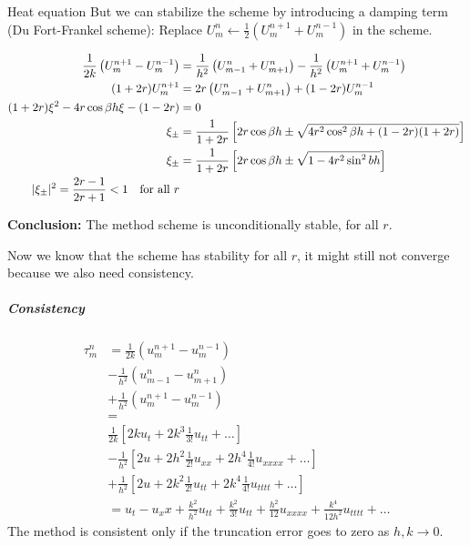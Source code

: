 \begin{example}{Heat equation}{}
  But we can stabilize the scheme by introducing a damping term (Du Fort-Frankel scheme):
  Replace \( U_m^n \leftarrow \frac{1}{2}(U_m^{n+1} + U_m^{n-1}) \) in the scheme.

  \begin{align*}
    \frac{1}{2k}\left( U_m^{n+1} - U_m^{n-1} \right)
     & =
    \frac{1}{h^2}\left( U_{m-1}^n + U_{m+1}^n\right) - \frac{1}{h^2}\left( U_m^{n+1} + U_m^{n-1} \right) \\
    (1 + 2r)U_m^{n+1}
     & =
    2r\left( U_{m-1}^n + U_{m+1}^n \right) + (1 - 2r)U_m^{n-1}                                           \\
    (1 + 2r)\xi^2 - 4r \cos \beta h \xi - (1 - 2r)
     & = 0                                                                                               \\
    \xi_\pm
     & = \frac{1}{1 + 2r} \left[ 2r\cos \beta h \pm \sqrt{4r^2\cos^2 \beta h + (1 - 2r)(1 + 2r)} \right] \\
    \xi_\pm
     & = \frac{1}{1 + 2r} \left[ 2r\cos \beta h \pm \sqrt{1 - 4r^2 \sin^2 {bh}} \right]                  \\
    \lvert\xi_\pm\rvert^2 = \frac{2r - 1}{2r + 1} < 1 \quad \text{for all } r                                  \\
  \end{align*}

  \textbf{Conclusion:} The method scheme is unconditionally stable, for all \( r \).

  Now we know that the scheme has stability for all \( r \), it might still not converge because we also need consistency.

  \subparagraph{Consistency}
  \begin{align*}
    \tau_m^n & = \frac{1}{2k}\left( u_m^{n+1} - u_m^{n-1} \right)                                               \\
             & - \frac{1}{h^2}\left( u_{m-1}^n - u_{m+1}^n \right)                                              \\
             & + \frac{1}{h^2}\left( u_m^{n+1} - u_m^{n-1} \right)                                              \\
             & =                                                                                                \\
             & \frac{1}{2k}\left[ 2k u_t + 2k^3 \frac{1}{3!}u_{tt} + \ldots \right]                             \\
             & -\frac{1}{h^2}\left[ 2u + 2h^2 \frac{1}{2!}u_{xx} + 2h^4 \frac{1}{4!}u_{xxxx} + \ldots \right]   \\
             & + \frac{1}{h^2}\left[ 2 u + 2k^2 \frac{1}{2!}u_{tt} + 2k^4 \frac{1}{4!}u_{tttt} + \ldots \right] \\
             & =
    u_t - u_xx
    + \frac{k^2}{h^2}u_{tt} + \frac{k^2}{3!}u_{tt}
    + \frac{h^2}{12}u_{xxxx} + \frac{k^4}{12h^2}u_{tttt}
    + \ldots
  \end{align*}
  The method is consistent only if the truncation error goes to zero as \( h, k \to 0 \).


\end{example}
